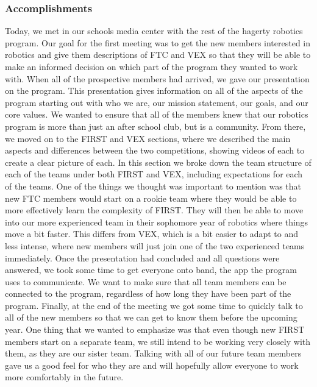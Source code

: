 \subsubsection*{Accomplishments}
Today, we met in our schools media center with the rest of the hagerty robotics program. Our goal for the first meeting was to get the new members interested in robotics and give them descriptions of FTC and VEX so that they will be able to make an informed decision on which part of the program they wanted to work with. 
When all of the prospective members had arrived, we gave our presentation on the program. This presentation gives information on all of the aspects of the program starting out with who we are, our mission statement, our goals, and our core values. We wanted to ensure that all of the members knew that our robotics program is more than just an after school club, but is a community. 
From there, we moved on to the FIRST and VEX sections, where we described the main aspects and differences between the two competitions, showing videos of each to create a clear picture of each. In this section we broke down the team structure of each of the teams under both FIRST and VEX, including expectations for each of the teams. One of the things we thought was important to mention was that new FTC members would start on a rookie team where they would be able to more effectively learn the complexity of FIRST. They will then be able to move into our more experienced team in their sophomore year of robotics where things move a bit faster. This differs from VEX, which is a bit easier to adapt to and less intense, where new members will just join one of the two experienced teams immediately. 
Once the presentation had concluded and all questions were answered, we took some time to get everyone onto band, the app the program uses to communicate. We want to make sure that all team members can be connected to the program, regardless of how long they have been part of the program.
Finally, at the end of the meeting we got some time to quickly talk to all of the new members so that we can get to know them before the upcoming year. One thing that we wanted to emphasize was that even though new FIRST members start on a separate team, we still intend to be working very closely with them, as they are our sister team. Talking with all of our future team members gave us a good feel for who they are and will hopefully allow everyone to work more comfortably in the future.

 

